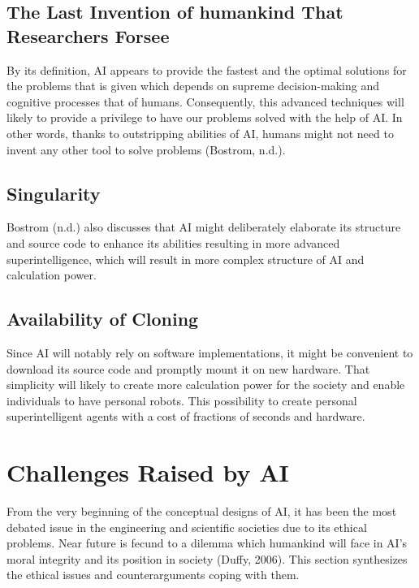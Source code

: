 \documentclass[man]{apa6}
\begin{document}
\subsection{The Last Invention of humankind That Researchers Forsee}
By its definition, AI appears to provide the fastest and the optimal solutions for the problems that is given which depends on supreme decision-making and cognitive processes that of humans. Consequently, this advanced techniques will likely to provide a privilege to have our problems solved with the help of AI. In other words, thanks to outstripping abilities of AI, humans might not need to invent any other tool to solve problems (Bostrom, n.d.).
\subsection{Singularity}
Bostrom (n.d.) also discusses that AI might deliberately elaborate its structure and source code to enhance its abilities resulting in more advanced superintelligence, which will result in more complex structure of AI and calculation power.
\subsection{Availability of Cloning}
Since AI will notably rely on software implementations, it might be convenient to download its source code and promptly mount it on new hardware. That simplicity will likely to create more calculation power for the society and enable individuals to have personal robots. This possibility to create personal superintelligent agents with a cost of fractions of seconds and hardware.
\section{Challenges Raised by AI}
From the very beginning of the conceptual designs of AI, it has been the most debated issue in the engineering and scientific societies due to its ethical problems. Near future is fecund to a dilemma which humankind will face in AI's moral integrity and its position in society (Duffy, 2006). This section synthesizes the ethical issues and counterarguments coping with them.
\end{document}
